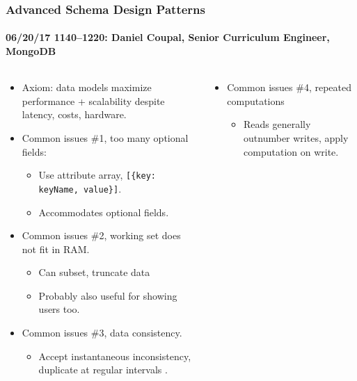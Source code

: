 \documentclass[xcolor=dvipsnames, 9pt]{beamer}
\begin{document}
\begin{frame}
    \frametitle{Advanced Schema Design Patterns}
    \framesubtitle{%
        06/20/17 1140--1220:
        Daniel Coupal, Senior Curriculum Engineer, MongoDB
    }
    \begin{columns}
        \begin{column}{0.5\textwidth}
            \begin{itemize}
                \item Axiom: data models maximize performance + scalability
                    despite latency, costs, hardware.
                \item Common issues \#1, too many optional fields:
                    \begin{itemize}
                        \item Use attribute array, \texttt{[\{key: keyName, value\}]}.
                        \item Accommodates optional fields.
                    \end{itemize}
                \item Common issues \#2, working set does not fit in RAM.%
                    \begin{itemize}
                        \item Can subset, truncate data
                        \item Probably also useful for showing users too.
                    \end{itemize}
                \item Common issues \#3, data consistency.
                    \begin{itemize}
                        \item Accept instantaneous inconsistency, duplicate at
                            regular intervals \frownie.
                    \end{itemize}
            \end{itemize}
        \end{column}
        \begin{column}{0.5\textwidth}
            \begin{itemize}
                \item Common issues \#4, repeated computations
                    \begin{itemize}
                        \item Reads generally outnumber writes, apply
                            computation on write.
                    \end{itemize}

\end{itemize}
\end{column}
\end{columns}
\end{frame}
\end{document}
